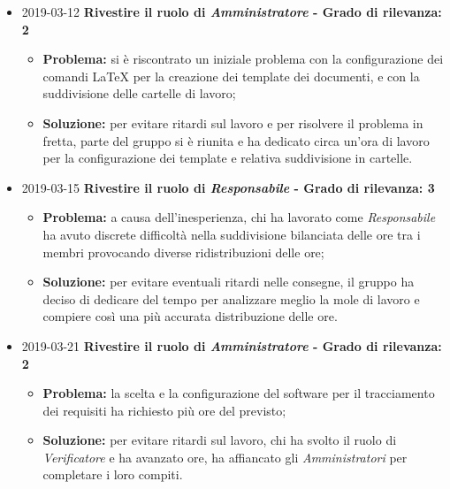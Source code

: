 \begin{itemize}

		\item 2019-03-12 \textbf{Rivestire il ruolo di \textit{Amministratore} - Grado di rilevanza: 2} \\
		\begin{itemize}
			\item \textbf{Problema:} si è riscontrato un iniziale problema con la configurazione dei comandi \LaTeX{} per la creazione dei template dei documenti, e con la suddivisione delle cartelle di lavoro;
			\item \textbf{Soluzione:} per evitare ritardi sul lavoro e per risolvere il problema in fretta, parte del gruppo si è riunita e ha dedicato circa un'ora di lavoro per la configurazione dei template e relativa suddivisione in cartelle.
		\end{itemize}	
		
		\item 2019-03-15 \textbf{Rivestire il ruolo di \textit{Responsabile} - Grado di rilevanza: 3} \\
		\begin{itemize}
			\item \textbf{Problema:} a causa dell'inesperienza, chi ha lavorato come \textit{Responsabile} ha avuto discrete
		difficoltà nella suddivisione bilanciata delle ore tra i membri provocando 
		diverse ridistribuzioni delle ore;
			\item \textbf{Soluzione:} per evitare eventuali ritardi nelle consegne, il gruppo ha deciso di dedicare 
		del tempo per analizzare meglio la mole di lavoro e compiere così una più
		accurata distribuzione delle ore.
		\end{itemize}
		
						
		\item 2019-03-21 \textbf{Rivestire il ruolo di \textit{Amministratore} - Grado di rilevanza: 2} \\
		\begin{itemize}
			\item \textbf{Problema:} la scelta e la configurazione del software per il tracciamento dei requisiti
		ha richiesto più ore del previsto;
			\item \textbf{Soluzione:} per evitare ritardi sul lavoro, chi ha svolto il ruolo di \textit{Verificatore}
		e ha avanzato ore, ha affiancato gli \textit{Amministratori} per completare 
		i loro compiti.
		\end{itemize}
		
\end{itemize}
